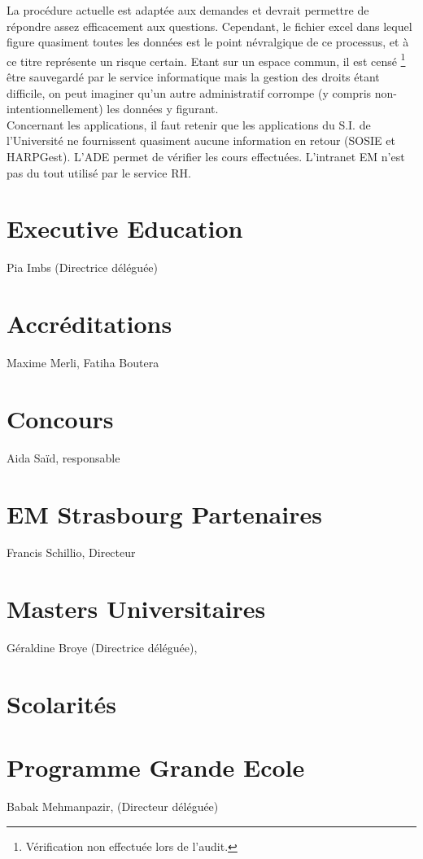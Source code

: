 \documentclass{book}
\begin{document}
La procédure actuelle est adaptée aux demandes et devrait permettre de 
répondre assez efficacement aux questions. Cependant, le fichier excel
dans lequel figure quasiment toutes les données est le point névralgique
de ce processus, et à ce titre représente un risque certain. Etant sur
un espace commun, il est censé%
\footnote{Vérification non effectuée lors de l'audit.}
être sauvegardé par le service informatique mais la gestion des droits
étant difficile, on peut imaginer qu'un autre administratif corrompe 
(y compris non-intentionnellement) les données y figurant.\\

Concernant les applications, il faut retenir que les applications
du S.I. de l'Université ne fournissent quasiment aucune information en
retour (SOSIE et HARPGest). L'ADE permet de vérifier les cours effectuées.
L'intranet EM n'est pas du tout utilisé par le service RH.
 

\section{Executive Education }
Pia Imbs (Directrice déléguée)

\section{Accréditations}
Maxime Merli, Fatiha Boutera

\section{Concours }
Aida Saïd, responsable

\section{EM Strasbourg Partenaires }
Francis Schillio, Directeur 

\section{Masters Universitaires}
Géraldine Broye (Directrice déléguée),

 
\section{Scolarités}

\section{Programme Grande Ecole}
Babak Mehmanpazir, (Directeur déléguée)
\end{document}
